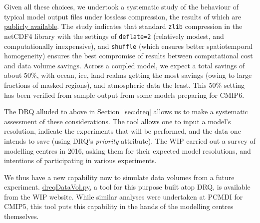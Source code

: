 \documentclass[gmd,manuscript]{copernicus}
\newcommand{\secref}[1] {\mbox{Section  \ref{sec:#1}}}
\begin{document}
\begin{enumerate}
  Given all these choices, we undertook a systematic study of the
  behaviour of typical model output files under lossless compression,
  the results of which are \href{https://goo.gl/qkdDnn}{publicly 
  available}. The study indicates that standard \texttt{zlib}
  compression in the netCDF4 library with the settings of
  \texttt{deflate=2} (relatively modest, and computationally
  inexpensive), and \texttt{shuffle} (which ensures better
  spatiotemporal homogeneity) ensures the best compromise of results
  between computational cost and data volume savings. Across a coupled
  model, we expect a total savings of about 50\%, with ocean, ice,
  land realms getting the most savings (owing to large fractions of
  masked regions), and atmospheric data the least. This 50\% setting
  has been verified from sample output from some models preparing for
  CMIP6.
\end{enumerate}

The \href{https://goo.gl/iNBQ9m}{DRQ} alluded to above in
\secref{dreq} allows us to make a systematic assessment of these
considerations. The tool allows one to input a model's resolution,
indicate the experiments that will be performed, and the data
one intends to save (using DRQ's \emph{priority} attribute). The WIP
carried out a survey of modelling centres in 2016, asking them for
their expected model resolutions, and intentions of participating in
various experiments. 

We thus have a new capability now to
simulate data volumes from a future experiment.
\href{https://goo.gl/Ezz5v3}{dreqDataVol.py}, a tool for this purpose
built atop DRQ, is available from the WIP website. While similar
analyses were undertaken at PCMDI for CMIP5, this tool puts this
capability in the hands of the modelling centres themselves.
\end{document}
